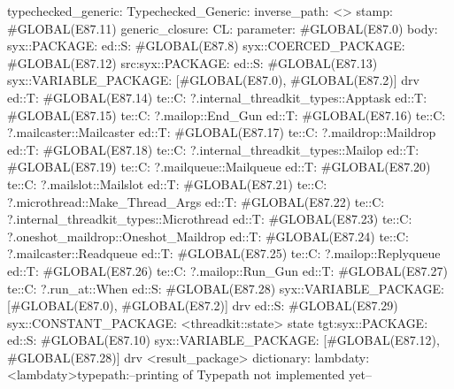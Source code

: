 typechecked_generic:
Typechecked_Generic:
inverse_path: <>
stamp: #GLOBAL(E87.11)
generic_closure:
CL:
parameter: #GLOBAL(E87.0)
body: syx::PACKAGE:
        ed::S: #GLOBAL(E87.8)
            syx::COERCED_PACKAGE:
                #GLOBAL(E87.12)
                 src:syx::PACKAGE:
                    ed::S: #GLOBAL(E87.13) syx::VARIABLE_PACKAGE: [#GLOBAL(E87.0), #GLOBAL(E87.2)] drv
                    ed::T: #GLOBAL(E87.14)
                     te::C:
                     ?.internal_threadkit_types::Apptask
                    ed::T: #GLOBAL(E87.15)
                     te::C:
                     ?.mailop::End_Gun
                    ed::T: #GLOBAL(E87.16)
                     te::C:
                     ?.mailcaster::Mailcaster
                    ed::T: #GLOBAL(E87.17)
                     te::C:
                     ?.maildrop::Maildrop
                    ed::T: #GLOBAL(E87.18)
                     te::C:
                     ?.internal_threadkit_types::Mailop
                    ed::T: #GLOBAL(E87.19)
                     te::C:
                     ?.mailqueue::Mailqueue
                    ed::T: #GLOBAL(E87.20)
                     te::C:
                     ?.mailslot::Mailslot
                    ed::T: #GLOBAL(E87.21)
                     te::C:
                     ?.microthread::Make_Thread_Args
                    ed::T: #GLOBAL(E87.22)
                     te::C:
                     ?.internal_threadkit_types::Microthread
                    ed::T: #GLOBAL(E87.23)
                     te::C:
                     ?.oneshot_maildrop::Oneshot_Maildrop
                    ed::T: #GLOBAL(E87.24)
                     te::C:
                     ?.mailcaster::Readqueue
                    ed::T: #GLOBAL(E87.25)
                     te::C:
                     ?.mailop::Replyqueue
                    ed::T: #GLOBAL(E87.26)
                     te::C:
                     ?.mailop::Run_Gun
                    ed::T: #GLOBAL(E87.27)
                     te::C:
                     ?.run_at::When
                    ed::S: #GLOBAL(E87.28)
                     syx::VARIABLE_PACKAGE:
                     [#GLOBAL(E87.0), #GLOBAL(E87.2)]
                     drv
                    ed::S: #GLOBAL(E87.29)
                     syx::CONSTANT_PACKAGE:
                     <threadkit::state>
                     state
                tgt:syx::PACKAGE:
                 ed::S: #GLOBAL(E87.10) syx::VARIABLE_PACKAGE: [#GLOBAL(E87.12), #GLOBAL(E87.28)] drv
         <result_package>
dictionary:
lambdaty:
  <lambdaty>typepath:--printing of Typepath not implemented yet--
